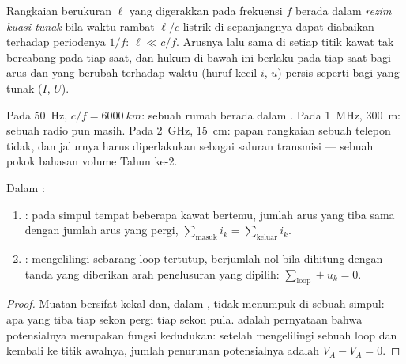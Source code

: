 \begin{definition}\label{def:b1:dc-circuits:arqs}
Rangkaian berukuran $\ell$ yang digerakkan pada frekuensi $f$ berada
dalam \emph{rezim kuasi-tunak} bila waktu rambat $\ell/c$ 
listrik di sepanjangnya dapat diabaikan terhadap periodenya $1/f$:
$\ell \ll c/f$. Arusnya lalu sama di setiap titik kawat tak bercabang
pada tiap saat, dan hukum di bawah ini berlaku pada tiap saat bagi arus
dan  yang berubah terhadap waktu (huruf kecil $i$, $u$) persis
seperti bagi yang tunak ($I$, $U$).
\end{definition}

\begin{example}\label{ex:b1:dc-circuits:arqs}
Pada \qty{50}{Hz}, $c/f = \qty{6000}{km}$: sebuah rumah berada dalam
. Pada \qty{1}{MHz}, \qty{300}{m}: sebuah radio pun
masih. Pada \qty{2}{GHz}, \qty{15}{cm}: papan rangkaian sebuah telepon
tidak, dan jalurnya harus diperlakukan sebagai saluran transmisi ---
sebuah pokok bahasan volume Tahun ke-2.
\end{example}

\begin{theorem}\label{thm:b1:dc-circuits:kirchhoff}
Dalam :
\begin{enumerate}
  \item \emph{}: pada simpul tempat beberapa kawat bertemu,
        jumlah arus yang tiba sama dengan jumlah arus yang pergi,
        $\sum_{\text{masuk}} i_k = \sum_{\text{keluar}} i_k$.
  \item \emph{}: mengelilingi sebarang loop tertutup, 
        berjumlah nol bila dihitung dengan tanda yang diberikan arah
        penelusuran yang dipilih: $\sum_{\text{loop}} \pm u_k = 0$.
\end{enumerate}
\end{theorem}

\begin{proof}
Muatan bersifat kekal dan, dalam , tidak menumpuk di
sebuah simpul: apa yang tiba tiap sekon pergi tiap sekon pula.  adalah pernyataan bahwa potensialnya merupakan fungsi
kedudukan: setelah mengelilingi sebuah loop dan kembali ke titik
awalnya, jumlah penurunan potensialnya adalah $V_A - V_A = 0$.
\end{proof}

